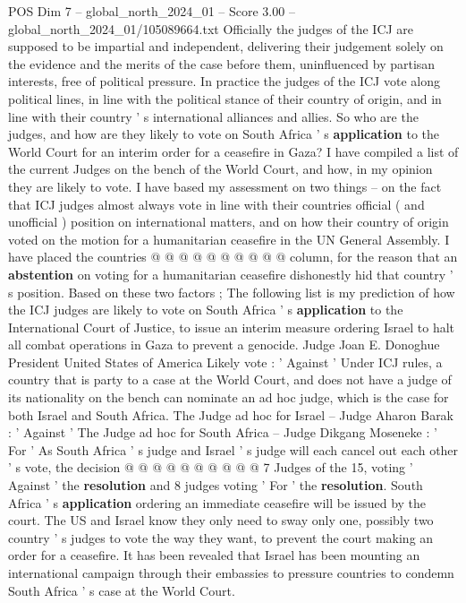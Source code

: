 \begin{textsample}{POS Dim 7 – global\_north\_2024\_01 – Score 3.00 – global\_north\_2024\_01/105089664.txt}  \label{ex:f7_pos_242}
Officially the judges of the ICJ are supposed to be impartial and independent, delivering their judgement solely on the evidence and the merits of the case before them, uninfluenced by partisan interests, free of political pressure.
In practice the judges of the ICJ vote along political lines, in line with the political stance of their country of origin, and in line with their country ' s international alliances and allies.
So who are the judges, and how are they likely to vote on South Africa ' s \textbf{application} to the World Court for an interim order for a ceasefire in Gaza?
I have compiled a list of the current Judges on the bench of the World Court, and how, in my opinion they are likely to vote.
I have based my assessment on two things -- on the fact that ICJ judges almost always vote in line with their countries official ( and unofficial ) position on international matters, and on how their country of origin voted on the motion for a humanitarian ceasefire in the UN General Assembly.
I have placed the countries @ @ @ @ @ @ @ @ @ @ column, for the reason that an \textbf{abstention} on voting for a humanitarian ceasefire dishonestly hid that country ' s position.
Based on these two factors ; The following list is my prediction of how the ICJ judges are likely to vote on South Africa ' s \textbf{application} to the International Court of Justice, to issue an interim measure ordering Israel to halt all combat operations in Gaza to prevent a genocide.
Judge Joan E.
Donoghue President United States of America Likely vote : ' Against ' Under ICJ rules, a country that is party to a case at the World Court, and does not have a judge of its nationality on the bench can nominate an ad hoc judge, which is the case for both Israel and South Africa.
The Judge ad hoc for Israel -- Judge Aharon Barak : ' Against ' The Judge ad hoc for South Africa -- Judge Dikgang Moseneke : ' For ' As South Africa ' s judge and Israel ' s judge will each cancel out each other ' s vote, the decision @ @ @ @ @ @ @ @ @ @ 7 Judges of the 15, voting ' Against ' the \textbf{resolution} and 8 judges voting ' For ' the \textbf{resolution}.
South Africa ' s \textbf{application} ordering an immediate ceasefire will be issued by the court.
The US and Israel know they only need to sway only one, possibly two country ' s judges to vote the way they want, to prevent the court making an order for a ceasefire.
It has been revealed that Israel has been mounting an international campaign through their embassies to pressure countries to condemn South Africa ' s case at the World Court.

\end{textsample}

